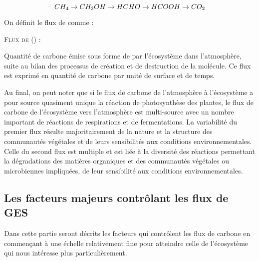$$
CH_{4} \rightarrow CH_{3}OH \rightarrow HCHO \rightarrow HCOOH \rightarrow CO_{2} \\
$$

On définit le flux de \chh comme : 
\begin{pdef}
\textsc{Flux de \chh (\fchh)} :

Quantité de carbone émise sous forme de \chh par l'écosystème dans l'atmosphère, suite au bilan des processus de création et de destruction de la molécule.
Ce flux est exprimé en quantité de carbone par unité de surface et de temps.
\end{pdef}




Au final, on peut noter que si le flux de carbone de l'atmosphère à l'écosystème a pour source quasiment unique la réaction de photosynthèse des plantes, le flux de carbone de l'écosystème vers l'atmosphère est multi-source avec un nombre important de réactions de respirations et de fermentations.
La variabilité du premier flux résulte majoritairement de la nature et la structure des communautés végétales et de leurs sensibilités aux conditions environnementales.
Celle du second flux est multiple et est liée à la diversité des réactions permettant la dégradations des matières organiques et des communautés végétales ou microbiennes impliquées, de leur sensibilité aux conditions environnementales.

\subsection{Les facteurs majeurs contrôlant les flux de GES}

Dans cette partie seront décrits les facteurs qui contrôlent les flux de carbone en commençant à une échelle relativement fine pour atteindre celle de l'écosystème qui nous intéresse plus particulièrement.

